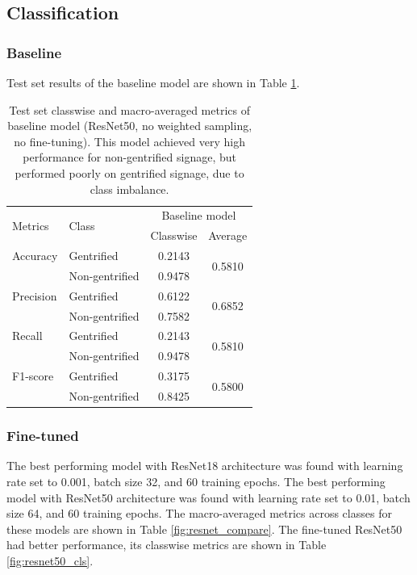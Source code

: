 \subsection{Classification}
\subsubsection{Baseline}
Test set results of the baseline model are shown in Table \ref{fig:baseline_metrics}. 

\begin{table}[h]
\begin{tabular}{llcc}
\toprule
\multirow{2}{*}{Metrics}   & \multirow{2}{*}{Class} & \multicolumn{2}{c}{Baseline model}        \\ \cline{3-4} 
                           &                        & Classwise & Average                 \\ \hline
Accuracy                   & Gentrified             & 0.2143    & \multirow{2}{*}{0.5810} \\
                           & Non-gentrified         & 0.9478    &                         \\
Precision                  & Gentrified             & 0.6122    & \multirow{2}{*}{0.6852} \\
                           & Non-gentrified         & 0.7582    &                         \\
Recall                     & Gentrified             & 0.2143    & \multirow{2}{*}{0.5810} \\
                           & Non-gentrified         & 0.9478    &                         \\
F1-score                   & Gentrified             & 0.3175    & \multirow{2}{*}{0.5800} \\
                           & Non-gentrified         & 0.8425    &                         \\
\bottomrule
\end{tabular}
\vspace{\baselineskip}
\caption{Test set classwise and macro-averaged metrics of baseline model (ResNet50, no weighted sampling, no fine-tuning). This model achieved very high performance for non-gentrified signage, but performed poorly on gentrified signage, due to class imbalance.}
\label{fig:baseline_metrics}
\vspace{-8mm}
\end{table}

\subsubsection{Fine-tuned}
The best performing model with ResNet18 architecture was found with learning rate set to 0.001, batch size 32, and 60 training epochs. The best performing model with ResNet50 architecture was found with learning rate set to 0.01, batch size 64, and 60 training epochs. The macro-averaged metrics across classes for these models are shown in Table \ref{fig:resnet_compare}. The fine-tuned ResNet50 had better performance, its classwise metrics are shown in Table \ref{fig:resnet50_cls}.

